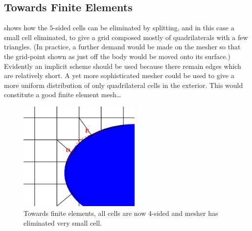 \subsection{Towards Finite Elements}\label{sec:elements}
 shows how the $5$-sided cells can be eliminated by splitting, and in
this case a small cell eliminated, to give a grid composed mostly of quadrilaterals with 
a few triangles.
(In practice, a further demand would be made on the mesher so that the grid-point
shown as just off the body would be moved onto its surface.) Evidently an implicit scheme
should be used because there remain edges which are relatively short. A yet more
sophisticated mesher could be used to give a more uniform distribution of only
quadrilateral cells in the exterior. This would constitute a good finite element mesh\ldots
\begin{figure}
\centerline{\includegraphics[width=6cm]{../pics/melde} }
\caption{Towards finite elements, all cells are now $4$-sided and mesher
has eliminated very small cell.
\label{fig:melde}}
\end{figure}
